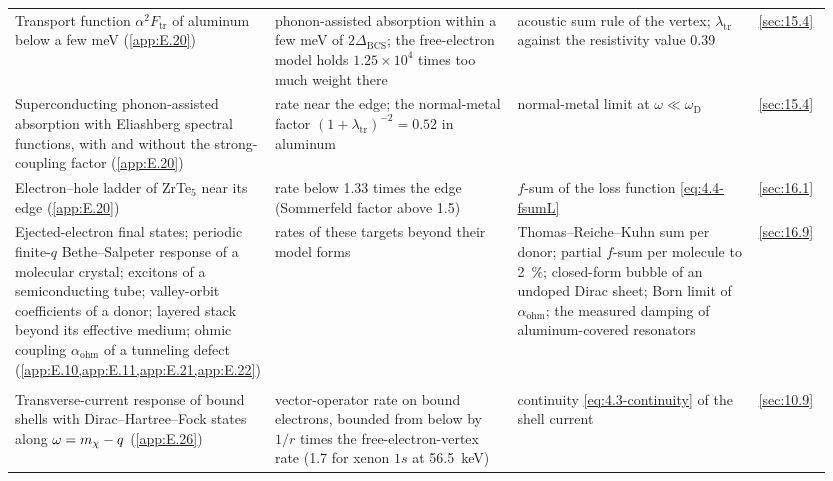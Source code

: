 {\begin{longtable}{@{}>{\raggedright\arraybackslash}p{0.25\linewidth}>{\raggedright\arraybackslash}p{0.305\linewidth}>{\raggedright\arraybackslash}p{0.305\linewidth}>{\raggedright\arraybackslash}p{0.09\linewidth}@{}}
  Transport function $\alpha^2F_{\mathrm{tr}}$ of aluminum below a few meV (\cref{app:E.20}) & phonon-assisted absorption within a few meV of $2\Delta_{\mathrm{BCS}}$; the free-electron model holds $1.25\times10^4$ times too much weight there & acoustic sum rule of the vertex; $\lambda_{\mathrm{tr}}$ against the resistivity value 0.39 & \cref{sec:15.4} \\
  Superconducting phonon-assisted absorption with Eliashberg spectral functions, with and without the strong-coupling factor (\cref{app:E.20}) & rate near the edge; the normal-metal factor $(1 + \lambda_{\mathrm{tr}})^{-2} = 0.52$ in aluminum & normal-metal limit at $\omega \ll \omega_{\mathrm{D}}$ & \cref{sec:15.4} \\
  Electron--hole ladder of ZrTe$_5$ near its edge (\cref{app:E.20}) & rate below 1.33 times the edge (Sommerfeld factor above 1.5) & $f$-sum of the loss function \cref{eq:4.4-fsumL} & \cref{sec:16.1} \\
  Ejected-electron final states; periodic finite-$q$ Bethe--Salpeter response of a molecular crystal; excitons of a semiconducting tube; valley-orbit coefficients of a donor; layered stack beyond its effective medium; ohmic coupling $\alpha_{\mathrm{ohm}}$ of a tunneling defect (\cref{app:E.10,app:E.11,app:E.21,app:E.22}) & rates of these targets beyond their model forms & Thomas--Reiche--Kuhn sum per donor; partial $f$-sum per molecule to \SI{2}{\percent}; closed-form bubble of an undoped Dirac sheet; Born limit of $\alpha_{\mathrm{ohm}}$; the measured damping of aluminum-covered resonators & \cref{sec:16.9} \\
  \midrule
  \multicolumn{4}{@{}l}{\emph{Fermionic absorption}} \\
  Transverse-current response of bound shells with Dirac--Hartree--Fock states along $\omega = m_{\chi} - q$ (\cref{app:E.26}) & vector-operator rate on bound electrons, bounded from below by $1/r$ times the free-electron-vertex rate (1.7 for xenon $1s$ at \SI{56.5}{keV}) & continuity \cref{eq:4.3-continuity} of the shell current & \cref{sec:10.9} \\
\end{longtable}}


